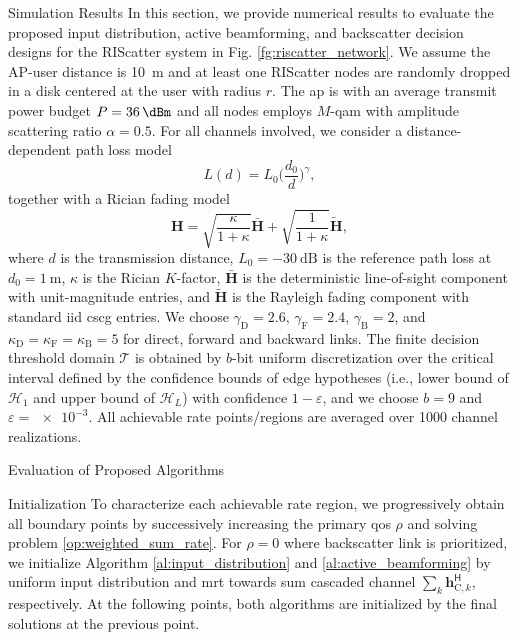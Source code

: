 \documentclass[journal]{IEEEtran}
\begin{document}
\begin{section}{Simulation Results}
	In this section, we provide numerical results to evaluate the proposed input distribution, active beamforming, and backscatter decision designs for the RIScatter system in Fig. \ref{fg:riscatter_network}.
	We assume the AP-user distance is \qty{10}{\meter} and at least one RIScatter nodes are randomly dropped in a disk centered at the user with radius $r$.
	The \gls{ap} is with an average transmit power budget $P=\qty{36}{\dBm}$ and all nodes employs $M$-\gls{qam} with amplitude scattering ratio $\alpha=0.5$.
	For all channels involved, we consider a distance-dependent path loss model
	\begin{equation}
		L(d) = L_0 \biggl(\frac{d_0}{d}\biggr)^\gamma,
	\end{equation}
	together with a Rician fading model
	\begin{equation}
		\boldsymbol{H} = \sqrt{\frac{\kappa}{1+\kappa}} \bar{\boldsymbol{H}} + \sqrt{\frac{1}{1+\kappa}} \tilde{\boldsymbol{H}},
	\end{equation}
	where $d$ is the transmission distance, $L_0=-\qty{30}{\dB}$ is the reference path loss at $d_0=\qty{1}{\meter}$, $\kappa$ is the Rician $K$-factor, $\bar{\boldsymbol{H}}$ is the deterministic line-of-sight component with unit-magnitude entries, and $\tilde{\boldsymbol{H}}$ is the Rayleigh fading component with standard \gls{iid} \gls{cscg} entries.
	We choose $\gamma_{\text{D}}=2.6$, $\gamma_{\text{F}}=2.4$, $\gamma_{\text{B}}=2$, and $\kappa_{\text{D}}=\kappa_{\text{F}}=\kappa_{\text{B}}=5$ for direct, forward and backward links.
	The finite decision threshold domain $\mathcal{T}$ is obtained by $b$-bit uniform discretization over the critical interval defined by the confidence bounds of edge hypotheses (i.e., lower bound of $\mathcal{H}_1$ and upper bound of $\mathcal{H}_L$) with confidence $1-\varepsilon$, and we choose $b=9$ and $\varepsilon=\num{e-3}$.
	All achievable rate points/regions are averaged over \num{1000} channel realizations.

	\begin{subsection}{Evaluation of Proposed Algorithms}
		\begin{subsubsection}{Initialization}
			To characterize each achievable rate region, we progressively obtain all boundary points by successively increasing the primary \gls{qos} $\rho$ and solving problem \eqref{op:weighted_sum_rate}.
			For $\rho=0$ where backscatter link is prioritized, we initialize Algorithm \ref{al:input_distribution} and \ref{al:active_beamforming} by uniform input distribution and \gls{mrt} towards sum cascaded channel $\sum_{k} \boldsymbol{h}_{\text{C},k}^\mathsf{H}$, respectively.
			At the following points, both algorithms are initialized by the final solutions at the previous point.
		\end{subsubsection}


\end{subsection}
\end{section}
\end{document}
